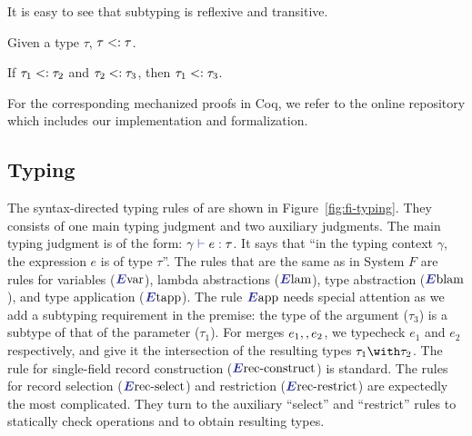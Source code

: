 
It is easy to see that subtyping is reflexive and transitive.

\begin{lemma} \label{sub-refl}
Given a type $ \tau $, $ \tau <: \tau $.
\end{lemma}

\begin{lemma} \label{sub-trans}
If $ \tau_1 <: \tau_2 $ and $ \tau_2 <: \tau_3 $,
then $ \tau_1 <: \tau_3 $.
\end{lemma}

For the corresponding mechanized proofs in Coq, we refer to the online
repository which includes our implementation and formalization. 

\subsection{Typing}

\begin{figure*}
  \small
  
  \caption{The type system of \name.}
  \label{fig:fi-typing}
\end{figure*}

The syntax-directed typing rules of \name are shown in Figure~\ref{fig:fi-typing}. They consists of one
main typing judgment and two auxiliary judgments. The main typing judgment is of
the form: $ \judgee \gamma e \tau $. It says that ``in the typing context
$\gamma$, the expression $e$ is of type $\tau$''. The rules that are the same as
in System $F$ are rules for variables ($\rulelabelevar$), lambda abstractions
($\rulelabelelam$), type abstraction ($\rulelabeleblam$), and type application
($\rulelabeletapp$). The rule $\rulelabeleapp$ needs special attention as we add
a subtyping requirement in the premise: the type of the argument ($\tau_3$) is a
subtype of that of the parameter ($\tau_1$). 
For merges
$e_1 ,, e_2$, we typecheck $e_1$ and $e_2$ respectively, and give it the
intersection of the resulting types $\tau_1 \andop \tau_2$. The rule for
single-field record construction ($\rulelabelerecconstruct$) is standard. The rules
for record selection ($\rulelabelerecselect$) and restriction
($\rulelabelerecrestrict$) are expectedly the most complicated. They turn to the
auxiliary ``select'' and ``restrict'' rules to statically check operations and
to obtain resulting types.

